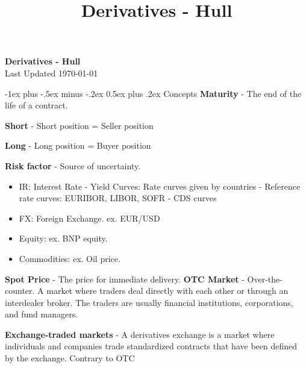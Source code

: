 \documentclass[10pt,landscape]{article}
\title{Derivatives - Hull}
\makeatletter
\renewcommand{\section}{\@startsection{section}{1}{0mm}%
                                {-1ex plus -.5ex minus -.2ex}%
                                {0.5ex plus .2ex}%
                                {\normalfont\large\bfseries}}
\makeatother
\begin{document}
\raggedright
\footnotesize

\begin{center}
    \vspace{-50mm}
    \Large{\vspace{-15mm}\textbf{Derivatives - Hull}} \\
    \footnotesize{Last Updated \today}
    \vspace{-.4mm}
\end{center}
\begin{multicols}{3}
    \setlength{\premulticols}{1pt}
    \setlength{\postmulticols}{1pt}
    \setlength{\multicolsep}{1pt}
    \setlength{\columnsep}{2pt}
    \section{Concepts}
    \textbf{Maturity} - The end of the life of a contract.
    
    \textbf{Short} - Short position = Seller position
    
    \textbf{Long} - Long position = Buyer position
    
    \textbf{Risk factor} - Source of uncertainty.
    \begin{itemize}[label={--},leftmargin=4mm]
        \vspace{-1mm}
        \itemsep -.4mm
        \item IR: Interest Rate
            \subitem - Yield Curves: Rate curves given by countries
            \subitem - Reference rate curves: EURIBOR, LIBOR, SOFR
            \subitem - CDS curves
        \item FX: Foreign Exchange. ex. EUR/USD
        \item Equity: ex. BNP equity.
        \item Commodities: ex. Oil price.

    \end{itemize}

    \textbf{Spot Price} - The price for immediate delivery.
    \textbf{OTC Market} - Over-the-counter. A market where traders deal directly with each other or through an interdealer broker. The traders are usually financial institutions, corporations, and fund managers.
    
    \textbf{Exchange-traded markets} - A derivatives exchange is a market where individuals and companies trade standardized contracts that have been defined by the exchange. Contrary to OTC
    

\end{multicols}
\end{document}
